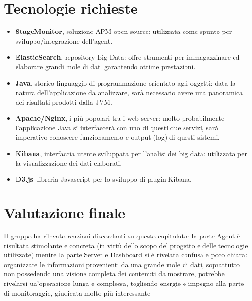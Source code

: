\documentclass[main.tex]{subfiles}
\begin{document}
\section{Tecnologie richieste}
\begin{itemize}
	\item \textbf{StageMonitor}, soluzione APM open source: utilizzata come spunto per sviluppo/integrazione dell'agent.
	\item \textbf{ElasticSearch}, repository Big Data: offre strumenti per immagazzinare ed elaborare grandi mole di dati garantendo ottime prestazioni.
	\item \textbf{Java}, storico linguaggio di programmazione orientato agli oggetti: data la natura dell'applicazione da analizzare, sarà necessario avere una panoramica dei risultati prodotti dalla JVM.
	\item \textbf{Apache/Nginx}, i più popolari tra i web server: molto probabilmente l'applicazione Java si interfaccerà con uno di questi due servizi, sarà imperativo conoscere funzionamento e output (log) di questi sistemi. 
	\item \textbf{Kibana}, interfaccia utente sviluppata per l'analisi dei big data: utilizzata per la visualizzazione dei dati elaborati.
	\item \textbf{D3.js}, libreria Javascript per lo sviluppo di plugin Kibana.
\end{itemize}
\section{Valutazione finale}
Il gruppo ha rilevato reazioni discordanti su questo capitolato: la parte Agent è risultata stimolante e concreta (in virtù dello scopo del progetto e delle tecnologie utilizzate) mentre la parte Server e Dashboard si è rivelata confusa e poco chiara: organizzare le informazioni provenienti da una grande mole di dati, soprattutto non possedendo una visione completa dei contenuti da mostrare, potrebbe rivelarsi un'operazione lunga e complessa, togliendo energie e impegno alla parte di monitoraggio, giudicata molto più interessante.  
\end{document}

